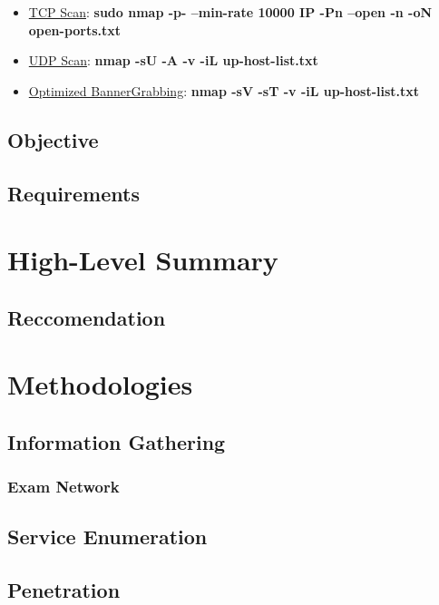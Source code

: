 \documentclass[11pt, a4paper]{article}
\begin{document}
\begin{itemize}
    \item \underline{TCP Scan}: \textbf{\color{red}sudo nmap -p- --min-rate 10000 IP -Pn --open -n -oN open-ports.txt}
    \item \underline{UDP Scan}: \textbf{\color{green}nmap -sU -A -v -iL up-host-list.txt}
    \item \underline{Optimized BannerGrabbing}: \textbf{nmap -sV -sT -v -iL up-host-list.txt}
\end{itemize}

\subsection{Objective}

\subsection{Requirements}

\section{High-Level Summary}

\subsection{Reccomendation}

\section{Methodologies}

\subsection{Information Gathering}

\subsubsection{Exam Network}

\subsection{Service Enumeration}

\subsection{Penetration}
\end{document}

